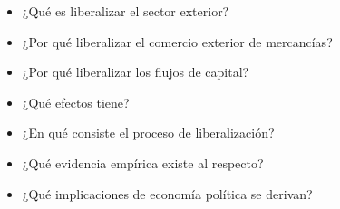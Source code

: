 \documentclass{nuevotema}
\begin{document}
\ideaclave

\begin{itemize}
	\item ¿Qué es liberalizar el sector exterior?
	\item ¿Por qué liberalizar el comercio exterior de mercancías?
	\item ¿Por qué liberalizar los flujos de capital?
	\item ¿Qué efectos tiene?
	\item ¿En qué consiste el proceso de liberalización?
	\item ¿Qué evidencia empírica existe al respecto?
	\item ¿Qué implicaciones de economía política se derivan?
\end{itemize}

\esquemacorto
\end{document}
